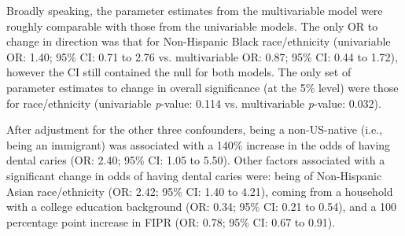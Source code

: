 Broadly speaking, the parameter estimates from the multivariable model were roughly comparable with those from the univariable models. The only OR to change in direction was that for Non-Hispanic Black race/ethnicity (univariable OR: 1.40; 95\% CI: 0.71 to 2.76 vs. multivariable OR: 0.87; 95\% CI: 0.44 to 1.72), however the CI still contained the null for both models. The only set of parameter estimates to change in overall significance (at the 5\% level) were those for race/ethnicity (univariable \emph{p}-value: 0.114 vs. multivariable \emph{p}-value: 0.032).

After adjustment for the other three confounders, being a non-US-native (i.e., being an immigrant) was associated with a 140\% increase in the odds of having dental caries (OR: 2.40; 95\% CI: 1.05 to 5.50). Other factors associated with a significant change in odds of having dental caries were: being of Non-Hispanic Asian race/ethnicity (OR: 2.42; 95\% CI: 1.40 to 4.21), coming from a household with a college education background (OR: 0.34; 95\% CI: 0.21 to 0.54), and a 100 percentage point increase in FIPR (OR: 0.78; 95\% CI: 0.67 to 0.91). 

